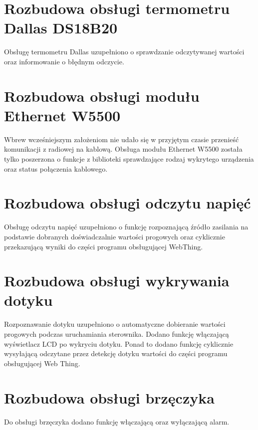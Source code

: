 \documentclass[11pt]{report}
\begin{document}
 \section{Rozbudowa obsługi termometru Dallas DS18B20}
 Obsługę termometru Dallas uzupełniono o sprawdzanie odczytywanej wartości oraz informowanie o błędnym odczycie.

 \section{Rozbudowa obsługi modułu Ethernet W5500}
 Wbrew wcześniejszym założeniom nie udało się w przyjętym czasie przenieść komunikacji z radiowej na kablową. Obsługa modułu Ethernet W5500 została tylko poszerzona o funkcje z biblioteki sprawdzające rodzaj wykrytego urządzenia oraz status połączenia kablowego.
 
 \section{Rozbudowa obsługi odczytu napięć}
 Obsługę odczytu napięć uzupełniono o funkcję rozpoznającą źródło zasilania na podstawie dobranych doświadczalnie wartości progowych oraz cyklicznie przekazującą wyniki do części programu obsługującej WebThing.
 
 \section{Rozbudowa obsługi wykrywania dotyku}
 Rozpoznawanie dotyku uzupełniono o automatyczne dobieranie wartości progowych podczas uruchamiania sterownika. Dodano funkcję włączającą wyświetlacz LCD po wykryciu dotyku. Ponad to dodano funkcję cyklicznie wysyłającą odczytane przez detekcję dotyku wartości do części programu obsługującej Web Thing.
 
 \section{Rozbudowa obsługi brzęczyka}
 Do obsługi brzęczyka dodano funkcję włączającą oraz wyłączającą alarm.
 
\end{document}
